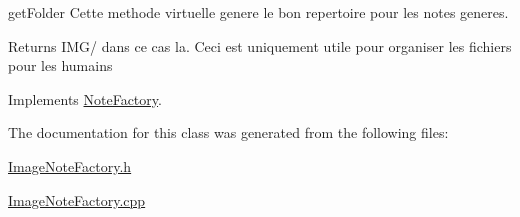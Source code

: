 get\-Folder Cette methode virtuelle genere le bon repertoire pour les notes generes. 

\begin{DoxyReturn}{Returns}
I\-M\-G/ dans ce cas la. Ceci est uniquement utile pour organiser les fichiers pour les humains 
\end{DoxyReturn}


Implements \hyperlink{class_note_factory_a9d4c924038af855a7c4a51455b13ab83}{Note\-Factory}.



The documentation for this class was generated from the following files\-:\begin{DoxyCompactItemize}
\item 
\hyperlink{_image_note_factory_8h}{Image\-Note\-Factory.\-h}\item 
\hyperlink{_image_note_factory_8cpp}{Image\-Note\-Factory.\-cpp}\end{DoxyCompactItemize}
